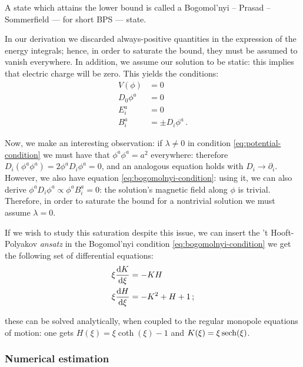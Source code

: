 \documentclass[main.tex]{subfiles}
\begin{document}
A state which attains the lower bound is called a Bogomol'nyi – Prasad – Sommerfield --- for short BPS --- state.

In our derivation we discarded always-positive quantities in the expression of the energy integrals; hence, in order to saturate the bound, they must be assumed to vanish everywhere. In addition, we assume our solution to be static: this implies that electric charge will be zero. This yields the conditions:
%
\begin{subequations}
\begin{align}
  V(\phi) &= 0 \label{eq:potential-condition}   \\
  D_0 \phi^a &= 0  \\
  E_i^a &= 0  \\
  B_i^a &= \pm D_i \phi^a  \label{eq:bogomolnyi-condition} \,.
\end{align}
\end{subequations}

Now, we make an interesting observation: if \(\lambda \neq 0\) in condition \eqref{eq:potential-condition} we must have that \(\phi^a \phi^a = a^2\) everywhere: therefore \(D_i (\phi^a \phi^a) = 2 \phi^a D_i \phi^a = 0\), and an analogous equation holds with \(D_i \rightarrow \partial_i\).
However, we also have equation \eqref{eq:bogomolnyi-condition}: using it, we can also derive \(\phi^a D_i \phi^a \propto \phi^a B_i^a = 0\): the solution's magnetic field along \(\phi \) is trivial. 
Therefore, in order to saturate the bound for a nontrivial solution we must assume \(\lambda = 0\).

If we wish to study this saturation despite this issue, we can insert the 't Hooft-Polyakov \emph{ansatz} in the Bogomol'nyi condition \eqref{eq:bogomolnyi-condition} we get the following set of differential equations:
%
\begin{subequations}
\begin{align}
  \xi \dv{K}{\xi}  &=  -KH   \\
  \xi \dv{H}{\xi} &= -K^2 + H + 1 \,;
\end{align}
\end{subequations}

these can be solved analytically, when coupled to the regular monopole equations of motion: one gets $H(\xi) = \xi \coth(\xi) -1$ and $K(\xi) = \xi \sech(\xi)$.

\subsubsection{Numerical estimation}
\end{document}
